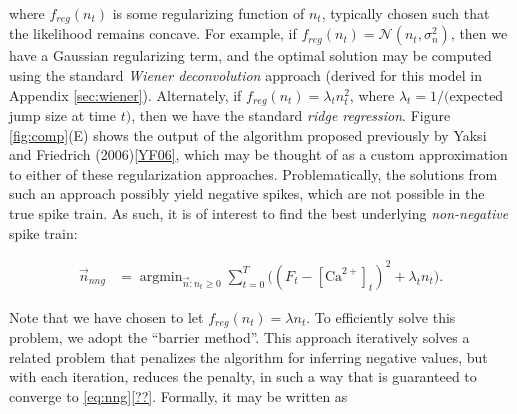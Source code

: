 \documentclass[12pt]{article}
\providecommand{\ve}[1]{\vec{#1}}
\providecommand{\ve}[1]{\boldsymbol{#1}}
\DeclareMathOperator*{\argmin}{argmin}
\newcommand{\Ca}{[\text{Ca}^{2+}]}
\begin{document}
\noindent where $f_{reg}(n_t)$ is some regularizing function of $n_t$, typically chosen such that the likelihood remains concave.  For example, if $f_{reg}(n_t)=\mathcal{N}(n_t,\sigma_n^2)$, then we have a Gaussian regularizing term, and the optimal solution may be computed using the standard \emph{Wiener deconvolution} approach (derived for this model in Appendix \ref{sec:wiener}).  Alternately, if $f_{reg}(n_t)=\lambda_t n_t^2$, where $\lambda_t=1/($expected jump size at time $t)$, then we have the standard \emph{ridge regression}.  Figure \ref{fig:comp}(E) shows the output of the algorithm proposed previously by Yaksi and Friedrich (2006)\ref{YF06}, which may be thought of as a custom approximation to either of these regularization approaches.  Problematically, the solutions from such an approach possibly yield negative spikes, which are not possible in the true spike train.  As such, it is of interest to find the best underlying \emph{non-negative} spike train:



\begin{align} \label{eq:nng}
\ve{n}_{nng} &= \argmin_{\ve{n}: n_t \geq 0} \sum_{t=0}^T \big((F_t - \Ca_t)^2 +  \lambda_t n_t\big).
\end{align}

\noindent Note that we have chosen to let $f_{reg}(n_t)=\lambda n_t$. To efficiently solve this problem, we adopt the ``barrier method''.  This approach iteratively solves a related problem that penalizes the algorithm for inferring negative values, but with each iteration, reduces the penalty, in such a way that is guaranteed to converge to \eqref{eq:nng}\ref{??}.  Formally, it may be written as
\end{document}
